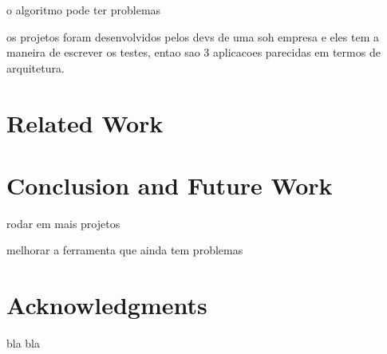 \documentclass{sig-alternate}
\begin{document}
o algoritmo pode ter problemas

os projetos foram desenvolvidos pelos devs de uma soh empresa e eles tem a maneira de escrever
os testes, entao sao 3 aplicacoes parecidas em termos de arquitetura.

\section{Related Work}











\section{Conclusion and Future Work}

rodar em mais projetos

melhorar a ferramenta que ainda tem problemas

\section{Acknowledgments}

bla bla



\end{document}
